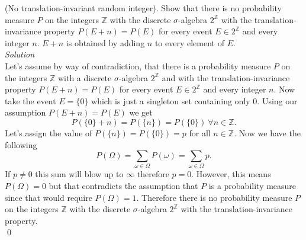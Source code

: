 \documentclass[10pt]{amsart}
\begin{document}
 (No translation-invariant random integer). Show that there is no probability measure $P$ on the integers $\mathds{Z}$ with the discrete
$\sigma$-algebra $2^{\mathds{Z}}$ with the translation-invariance property $P(E + n) = P(E)$ for every event $E \in 2^{\mathds{Z}}$ and every integer $n$. $E+n$ is obtained by adding $n$ to every element of $E$.
\\
\textit{ Solution} \\
Let's assume by way of contradiction, that there is a probability measure $P$ on the integers $\mathds{Z}$ with a discrete $\sigma$-algebra $2^{\mathds{Z}}$ and with the translation-invariance property $P(E + n) = P(E)$ for every event $E \in 2^{\mathds{Z}}$ and every integer $n$.
Now take the event $E = \{0\}$ which is just a singleton set containing only 0.
Using our assumption $P(E + n) = P(E)$ we get $$P(\{0\} + n) = P(\{n\}) = P(\{0\}) \: \forall n \in \mathds{Z}.$$
Let's assign the value of $P(\{n\}) = P(\{0\}) = p$ for all $n \in \mathds{Z}$.
Now we have the following $$P(\Omega) = \sum_{\omega \in \Omega} P(\omega) = \sum_{\omega \in \Omega} p.$$
If $ p \neq 0$ this sum will blow up to $\infty$ therefore $p = 0$.
However, this means $P(\Omega) = 0$ but that contradicts the assumption that $P$ is a probability measure since that would require $P(\Omega)= 1$.
Therefore there is no probability measure $P$ on the integers $\mathds{Z}$ with the discrete $\sigma$-algebra $2^{\mathds{Z}}$ with the translation-invariance property. \\
\qed
\end{document}
